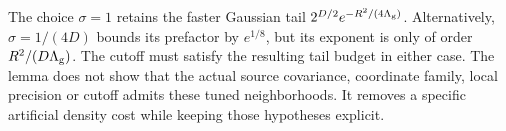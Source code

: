 The choice $\sigma=1$ retains the faster Gaussian tail
$2^{D/2}e^{-R^2/(4\Lambda_{\rm g})}$. Alternatively,
$\sigma=1/(4D)$ bounds its prefactor by $e^{1/8}$,
but its exponent is only of order $R^2/(D\Lambda_{\rm g})$.
The cutoff must satisfy the resulting tail budget in either
case. The lemma does not show that the actual source
covariance, coordinate family, local precision or cutoff
admits these tuned neighborhoods. It removes a specific
artificial density cost while keeping those hypotheses
explicit.
